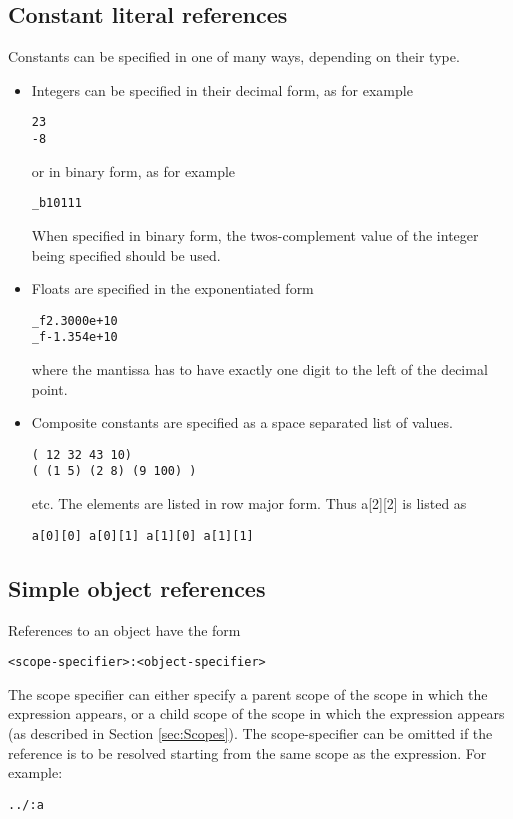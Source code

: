 \documentclass{article}
\begin{document}
\subsection{Constant literal references} 

Constants can be specified in one of many
ways, depending on their type.
\begin{itemize}
\item Integers can be specified in their
decimal form, as for example 
\begin{verbatim}
23
-8
\end{verbatim}
or in binary form, as for example
\begin{verbatim}
_b10111
\end{verbatim}
When specified in binary form, the twos-complement
value of the integer being specified should be
used.
\item Floats are specified in the exponentiated
form
\begin{verbatim}
_f2.3000e+10
_f-1.354e+10
\end{verbatim}
where the mantissa has to have exactly one digit
to the left of the decimal point.
\item Composite constants are specified
as a space separated list of values.
\begin{verbatim}
( 12 32 43 10)
( (1 5) (2 8) (9 100) )
\end{verbatim}
etc.  The elements are listed in 
row major form.  Thus a[2][2] is
listed as
\begin{verbatim}
a[0][0] a[0][1] a[1][0] a[1][1]
\end{verbatim}
\end{itemize}

\subsection{Simple object references} 

References to an object have the form
\begin{verbatim}
<scope-specifier>:<object-specifier>
\end{verbatim}
The scope specifier can either specify a
parent scope of the scope in which the expression appears,
or a child scope of the scope in which the 
expression appears (as described in Section \ref{sec:Scopes}).  
The scope-specifier can be omitted
if the reference is to be resolved starting from the same scope
as the expression.
For example:
\begin{verbatim}
../:a
\end{verbatim}
\end{document}
